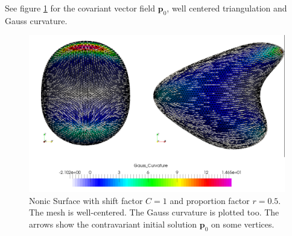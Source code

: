 \documentclass[a4paper,11pt]{scrartcl}
\newcommand{\p}{\mathbf{p}}
\begin{document}
    See figure \ref{figNonic} for the covariant vector field \( \p_{0} \), well centered triangulation and Gauss curvature.
    \begin{figure}
      \centering
      \includegraphics[width=.9\textwidth]{bilder/Nonic50p_1.png}
      \caption{Nonic Surface with shift factor \( C = 1 \) and proportion factor \( r = 0.5 \).
               The mesh is well-centered.
               The Gauss curvature is plotted too.
               The arrows show the contravariant initial solution \( \p_{0} \) on some vertices.}
      \label{figNonic}
    \end{figure}
\end{document}

